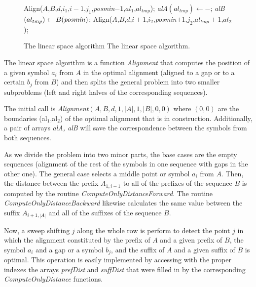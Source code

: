 \begin{figure}[t!]
\begin{center}
{{\begin{minipage}[][][c]{0.95\linewidth}
\begin{algorithmic}[5]
\ELSE
\STATE Align($A$,$B$,$d$,$i_1$,$i-1$,$j_1$,\emph{posmin}$-1$,$al_1$,$al_{tmp}$);
\STATE \emph{alA}$(al_{tmp}) \leftarrow -$;
\STATE \emph{alB}$(al_{tmp}) \leftarrow B(\mbox{\emph{posmin}})$;
\STATE Align($A$,$B$,$d$,$i+1$,$i_2$,\emph{posmin}$+1$,$j_2$,$al_{tmp}+1$,$al_2$);
\ENDIF
\ENDIF
\end{algorithmic}
\end{minipage}}}
          {The \citeauthor{hirschberg:1975a} linear space algorithm}%
          {The \citeauthor{hirschberg:1975a} linear space algorithm.}%
          {}
\end{center}
\end{figure}


The \citeauthor{hirschberg:1975a} linear space algorithm is a function \emph{Alignment} that computes the
position of a given symbol $a_i$ from $A$ in the optimal alignment (aligned to a gap or to a certain $b_j$
from $B$) and then splits the general problem into two smaller subproblems (left and right halves of the 
corresponding sequences).

The initial call is \emph{Alignment}$(A,B,d,1,|A|,1,|B|,0,0)$ where $(0,0)$ are the boundaries (al$_1$,al$_2$)
of the optimal alignment that is in construction. Additionally, a pair of arrays \emph{alA, alB} will
save the correspondence between the symbols from both sequences.

As we divide the problem into two minor parts, the base cases are the empty sequences (alignment of the rest
of the symbols in one sequence with gaps in the other one). The general case selects a middle point or symbol 
$a_i$ from $A$. Then, the distance between the prefix $A_{1,i-1}$ to all of the prefixes of the sequence $B$ 
is computed by the routine \emph{ComputeOnlyDistanceForward}. The routine \emph{ComputeOnlyDistanceBackward} 
likewise calculates the same value between the suffix $A_{i+1,|A|}$ and all of the suffixes of the sequence $B$.

Now, a sweep shifting $j$ along the whole row is perform to detect the point $j$ in which the alignment 
constituted by the prefix of $A$ and a given prefix of $B$, the symbol $a_i$ and a gap or a symbol $b_j$,
and the suffix of $A$ and a given suffix of $B$ is optimal. This operation is easily implemented by 
accessing with the proper indexes the arrays \emph{prefDist} and \emph{suffDist} that were filled in by 
the corresponding \emph{ComputeOnlyDistance} functions.

